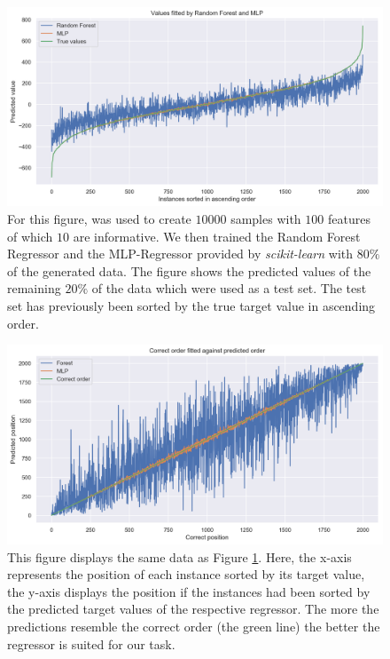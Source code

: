 	\begin{figure}[t]
		\centering
		\includegraphics[width=\linewidth]{images/mlp_forest_comparison01.png}
		\caption{For this figure,  was used to create $10000$ samples with $100$ features of which $10$ are informative. We then trained the Random Forest Regressor and the MLP-Regressor provided by \textit{scikit-learn} with $80\%$ of the generated data. The figure shows the predicted values of the remaining $20\%$ of the data which were used as a test set. The test set has previously been sorted by the true target value in ascending order.}
		\label{forest_mlp_comp1}
	\end{figure}
	\begin{figure}[t]
		\centering
		\includegraphics[width=\linewidth]{images/mlp_forest_comparison02.png}
		\caption{This figure displays the same data as Figure \ref{forest_mlp_comp1}. Here, the x-axis represents the position of each instance sorted by its target value, the y-axis displays the position if the instances had been sorted by the predicted target values of the respective regressor. The more the predictions resemble the correct order (the green line) the better the regressor is suited for our task.}
		\label{forest_mlp_comp2}
	\end{figure}